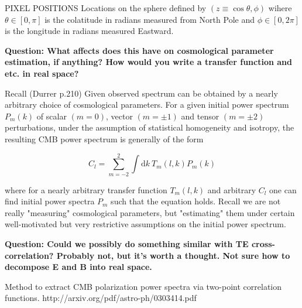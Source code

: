 \documentclass[a4paper, 11pt]{article}
\begin{document}
PIXEL POSITIONS 
Locations on the sphere defined by $(z\equiv\cos\theta, \phi)$ wihere $\theta\in[0,\pi]$ is the colatitude in radians measured from North Pole and $\phi\in[0,2\pi]$ is the longitude in radians measured Eastward. 

\textbf{Question: What affects does this have on cosmological parameter estimation, if anything? How would you write a transfer function and etc. in real space?}

Recall (Durrer p.210) Given observed spectrum can be obtained by a nearly arbitrary choice of cosmological parameters. For a given initial power spectrum $P_m(k)$ of scalar $(m=0)$, vector $(m=\pm1)$ and tensor $(m=\pm2)$ perturbations, under the assumption of statistical homogeneity and isotropy, the resulting CMB power spectrum is generally of the form

$$
C_l=\sum^2_{m=-2}\int\text{d}k \ T_m(l,k)P_m(k)
$$

where for a nearly arbitrary transfer function $T_m(l,k)$ and arbitrary $C_l$ one can find initial power spectra $P_m$ such that the equation holds. Recall we are not really "measuring" cosmological parameters, but "estimating" them under certain well-motivated but very restrictive assumptions on the initial power spectrum.


\textbf{Question: Could we possibly do something similar with TE cross-correlation? Probably not, but it's worth a thought. Not sure how to decompose E and B into real space.}

Method to extract CMB polarization power spectra via two-point correlation functions.
http://arxiv.org/pdf/astro-ph/0303414.pdf
\end{document}
